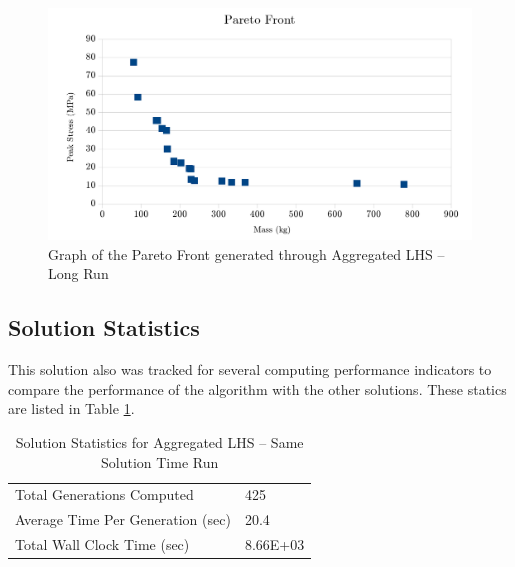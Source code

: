 \begin{figure}
\includegraphics[width=\textwidth]{img/s2i80g17_front.png}
\caption{Graph of the Pareto Front generated through Aggregated LHS -- Long Run}
\label{fig:pfront_agg_sametime}
\end{figure}

\subsection{Solution Statistics}
This solution also was tracked for several computing performance indicators to compare the performance of the algorithm with the other solutions. These statics are listed in Table \ref{tab:stat_agg_sametime}. 

\begin{table}[!htbp]
  \centering
  \begin{tabular}{|l|l|}
    \hline
	  Total Generations Computed & 425\\
    Average Time Per Generation (sec) & 20.4\\
    Total Wall Clock Time (sec)	 & 8.66E+03\\
    \hline
  \end{tabular}
  \caption{Solution Statistics for Aggregated LHS -- Same Solution Time Run}
  \label{tab:stat_agg_sametime}
\end{table} 
